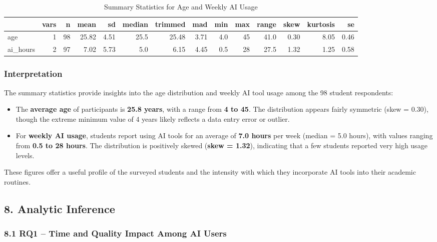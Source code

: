 \documentclass[
]{article}
\providecommand{\tightlist}{%
  \setlength{\itemsep}{0pt}\setlength{\parskip}{0pt}}
\begin{document}
\begin{longtable}[t]{lrrrrrrrrrrrrr}
\caption{\label{tab:descriptive-stats}Summary Statistics for Age and Weekly AI Usage}\\
\toprule
 & vars & n & mean & sd & median & trimmed & mad & min & max & range & skew & kurtosis & se\\
\midrule
age & 1 & 98 & 25.82 & 4.51 & 25.5 & 25.48 & 3.71 & 4.0 & 45 & 41.0 & 0.30 & 8.05 & 0.46\\
ai\_hours & 2 & 97 & 7.02 & 5.73 & 5.0 & 6.15 & 4.45 & 0.5 & 28 & 27.5 & 1.32 & 1.25 & 0.58\\
\bottomrule
\end{longtable}

\subsubsection{Interpretation}\label{interpretation}

The summary statistics provide insights into the age distribution and
weekly AI tool usage among the 98 student respondents:

\begin{itemize}
\tightlist
\item
  The \textbf{average age} of participants is \textbf{25.8 years}, with
  a range from \textbf{4 to 45}. The distribution appears fairly
  symmetric (skew = 0.30), though the extreme minimum value of 4 years
  likely reflects a data entry error or outlier.
\item
  For \textbf{weekly AI usage}, students report using AI tools for an
  average of \textbf{7.0 hours} per week (median = 5.0 hours), with
  values ranging from \textbf{0.5 to 28 hours}. The distribution is
  positively skewed (\textbf{skew = 1.32}), indicating that a few
  students reported very high usage levels.
\end{itemize}

These figures offer a useful profile of the surveyed students and the
intensity with which they incorporate AI tools into their academic
routines.

\subsection{8. Analytic Inference}\label{analytic-inference}

\subsubsection{8.1 RQ1 -- Time and Quality Impact Among AI
Users}\label{rq1-time-and-quality-impact-among-ai-users}
\end{document}
